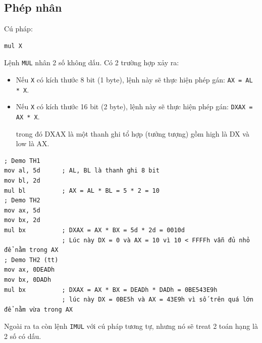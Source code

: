 \documentclass[12pt]{report}
\newcommand{\code}[1]{\texttt{#1}}
\begin{document}
\subsection{Phép nhân}
Cú pháp: 
\begin{verbatim}
mul X
\end{verbatim}
Lệnh \code{MUL} nhân 2 số không dấu.
Có 2 trường hợp xảy ra:
\begin{itemize}
    \item Nếu \code{X} có kích thước 8 bit (1 byte), lệnh này sẽ thực hiện phép gán: \code{AX = AL * X}.
    \item Nếu \code{X} có kích thước 16 bit (2 byte), lệnh này sẽ thực hiện phép gán: \code{DXAX = AX * X}.
    \par trong đó DXAX là một thanh ghi tổ hợp (tưởng tượng) gồm high là DX và low là AX.
\end{itemize} 

\begin{verbatim}
; Demo TH1 
mov al, 5d      ; AL, BL là thanh ghi 8 bit
mov bl, 2d 
mul bl          ; AX = AL * BL = 5 * 2 = 10
; Demo TH2 
mov ax, 5d 
mov bx, 2d 
mul bx          ; DXAX = AX * BX = 5d * 2d = 0010d
                ; Lúc này DX = 0 và AX = 10 vì 10 < FFFFh vẫn đủ nhỏ để nằm trong AX
; Demo TH2 (tt)
mov ax, 0DEADh
mov bx, 0DADh
mul bx          ; DXAX = AX * BX = DEADh * DADh = 0BE543E9h
                ; lúc này DX = 0BE5h và AX = 43E9h vì số trên quá lớn để nằm vừa trong AX
\end{verbatim}

Ngoài ra ta còn lệnh \code{IMUL} với cú pháp tương tự, nhưng nó sẽ treat 2 toán hạng là 2 số có dấu.
\end{document}
